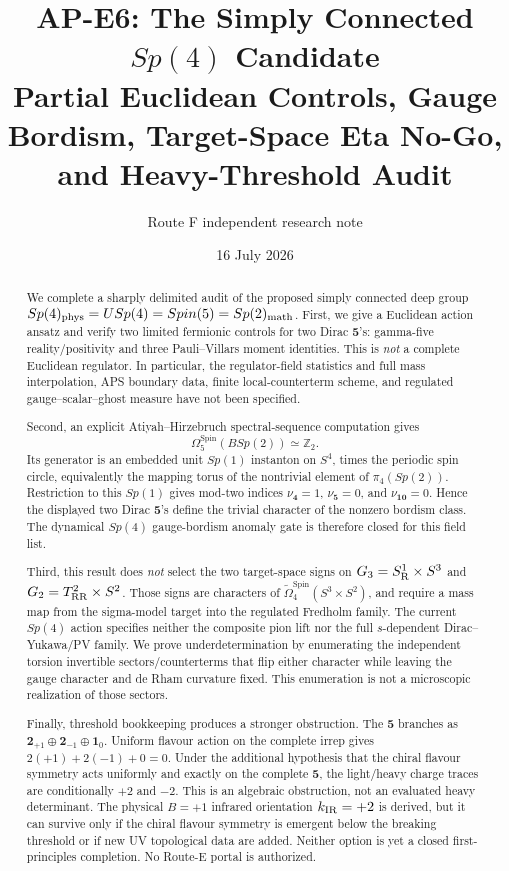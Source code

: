 \documentclass[11pt]{article}
\title{AP-E6: The Simply Connected \(Sp(4)\) Candidate\\
Partial Euclidean Controls, Gauge Bordism, Target-Space Eta No-Go,\\
and Heavy-Threshold Audit}
\author{Route F independent research note}
\date{16 July 2026}
\theoremstyle{definition}
\theoremstyle{remark}
\newcommand{\ZZ}{\mathbb Z}
\begin{document}
\maketitle

\begin{abstract}
We complete a sharply delimited audit of the proposed simply connected
deep group
\(Sp(4)_{\rm phys}=USp(4)=Spin(5)=Sp(2)_{\rm math}\).  First, we give a
Euclidean action ansatz and verify two limited fermionic controls for two
Dirac \(\bm5\)'s: gamma-five reality/positivity and three Pauli--Villars
moment identities.  This is \emph{not} a complete Euclidean regulator.
In particular, the regulator-field statistics and full mass interpolation,
APS boundary data, finite local-counterterm scheme, and regulated
gauge--scalar--ghost measure have not been specified.

Second, an explicit Atiyah--Hirzebruch spectral-sequence computation gives
\[
 \boxed{\Omega^{\mathrm{Spin}}_5(BSp(2))\simeq\ZZ_2.}
\]
Its generator is an embedded unit \(Sp(1)\) instanton on \(S^4\), times the
periodic spin circle, equivalently the mapping torus of the nontrivial
element of \(\pi_4(Sp(2))\).  Restriction to this \(Sp(1)\) gives mod-two
indices \(\nu_{\bm4}=1\), \(\nu_{\bm5}=0\), and
\(\nu_{\bm{10}}=0\).  Hence the displayed two Dirac \(\bm5\)'s define the
trivial character of the nonzero bordism class.  The dynamical
\(Sp(4)\) gauge-bordism anomaly gate is therefore closed for this field
list.

Third, this result does \emph{not} select the two target-space signs on
\(G_3=S^1_{\rm R}\times S^3\) and
\(G_2=T^2_{\rm RR}\times S^2\).  Those signs are characters of
\(\widetilde\Omega^{\mathrm{Spin}}_4(S^3\times S^2)\), and require a mass
map from the sigma-model target into the regulated Fredholm family.  The
current \(Sp(4)\) action specifies neither the composite pion lift nor the
full \(s\)-dependent Dirac--Yukawa/PV family.  We prove underdetermination
by enumerating the independent torsion invertible sectors/counterterms
that flip either character while leaving the gauge character and de Rham
curvature fixed.  This enumeration is not a microscopic realization of
those sectors.

Finally, threshold bookkeeping produces a stronger obstruction.  The
\(\bm5\) branches as
\(\bm2_{+1}\oplus\bm2_{-1}\oplus\bm1_0\).  Uniform flavour action on the
complete irrep gives
\(2(+1)+2(-1)+0=0\).  Under the additional hypothesis that the chiral
flavour symmetry acts uniformly and exactly on the complete \(\bm5\), the
light/heavy charge traces are conditionally \(+2\) and \(-2\).  This is an
algebraic obstruction, not an evaluated heavy determinant.
The physical \(B=+1\) infrared orientation \(k_{\rm IR}=+2\) is derived,
but it can survive only if the chiral flavour symmetry is emergent below
the breaking threshold or if new UV topological data are added.  Neither
option is yet a closed first-principles completion.  No Route-E portal is
authorized.
\end{abstract}
\end{document}
